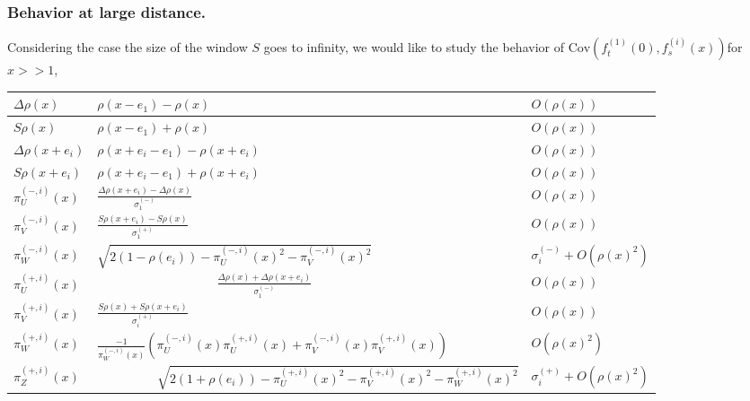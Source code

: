 \documentclass[12pt]{article}
\theoremstyle{Theorem}
\begin{document}
\subsubsection{Behavior at large distance.}
Considering the case the size of the window $S$ goes to infinity, we would like to study the behavior of $ \text{Cov}\left(f_{t}^{\scriptscriptstyle(1)}(0), f_{s}^{\scriptscriptstyle(i)}(x) \right)$for $x >> 1$, \\
\begin{table}[H]
\begin{tabularx}{\textwidth}{|l| l|X|}
\hline
$\Delta \rho(x)$ & \hspace{4cm}$\rho(x-e_1)-\rho(x)$ & $O(\rho(x))$ \\ \hline
$S\rho(x)$ & \hspace{4cm}$\rho(x-e_1)+\rho(x)$ & $O(\rho(x))$ \\  \hline
$\Delta \rho(x+e_i)$ &\hspace{3cm} $\rho(x+e_i-e_1)-\rho(x+e_i)$ & $O(\rho(x))$ \\ \hline 
$S\rho(x + e_i)$ & \hspace{3cm}$\rho(x+e_i-e_1)+\rho(x+e_i)$ & $O(\rho(x))$ \\\hline 
$\pi^{\scriptscriptstyle(-, i)}_{U}(x)$ &\hspace{4cm} $ \frac{\Delta \rho(x+e_i) -\Delta \rho(x)}{\sigma^{\scriptscriptstyle (-)}_{1}}$ & $O(\rho(x))$ \\  \hline
$\pi^{\scriptscriptstyle(-, i)}_{V}(x)$ & \hspace{4cm}   $\frac{S\rho(x+e_i)-S\rho(x)}{\sigma^{\scriptscriptstyle (+)}_{1}}$  & $O(\rho(x))$ \\  \hline
$\pi^{\scriptscriptstyle(-, i)}_{W}(x)$ & \hspace{2cm}$\sqrt{2(1 - \rho(e_{i})) - \pi^{\scriptscriptstyle(-, i)}_{U}(x)^{2} - \pi^{\scriptscriptstyle(-, i)}_{V}(x)^{2}} $ & {\tiny$ \sigma^{\scriptscriptstyle (-)}_{i} + O\left(\rho(x)^{2}\right)$}\\ 
\hline
$\pi^{\scriptscriptstyle(+, i)}_{U}(x)$ & $ \hspace{4cm} \frac{\Delta \rho(x) + \Delta \rho(x+e_i) }{\sigma^{\scriptscriptstyle (-)}_{1}}$ & $O(\rho(x))$  \\ \hline
$ \pi^{\scriptscriptstyle(+, i)}_{V}(x)$ & \hspace{4cm}$\frac{S \rho(x) + S\rho(x+e_i)}{\sigma^{\scriptscriptstyle (+)}_{i}} $ & $O(\rho(x))$ \\ \hline 
$ \pi^{\scriptscriptstyle(+, i)}_{W}(x) $ & $\frac{-1}{\pi^{\scriptscriptstyle(-, i)}_{W}(x)}\left(\pi^{\scriptscriptstyle(-, i)}_{U}(x)\pi^{\scriptscriptstyle(+, i)}_{U}(x) + \pi^{\scriptscriptstyle(-, i)}_{V}(x)\pi^{\scriptscriptstyle(+, i)}_{V}(x)\right) $ & $O\left(\rho(x)^2\right)$\\ \hline
$\pi^{\scriptscriptstyle(+, i)}_{Z}(x)$ & $ \hspace{2cm} \sqrt{2(1 + \rho(e_i)) - \pi^{\scriptscriptstyle(+, i)}_{U}(x)^{2} - \pi^{\scriptscriptstyle(+, i)}_{V}(x)^{2} - \pi^{\scriptscriptstyle(+, i)}_{W}(x)^{2}}$ & {\tiny$ \sigma^{\scriptscriptstyle (+)}_{i} + O\left(\rho(x)^{2}\right)$} \\\hline 
\end{tabularx}
\end{table}
\end{document}
